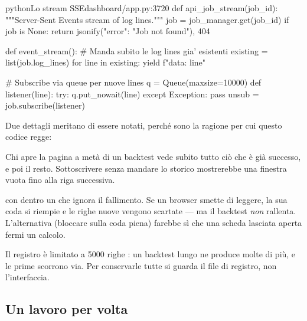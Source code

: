\begin{codiceInterno}{python}{Lo stream SSE}{dashboard/app.py:3720}
    def api_job_stream(job_id):
        """Server-Sent Events stream of log lines."""
        job = job_manager.get(job_id)
        if job is None:
            return jsonify({"error": "Job not found"}), 404

        def event_stream():
            # Manda subito le log lines gia' esistenti
            existing = list(job.log_lines)
            for line in existing:
                yield f"data: {line}\n\n"

            # Subscribe via queue per nuove lines
            q = Queue(maxsize=10000)
            def listener(line):
                try:
                    q.put_nowait(line)
                except Exception:
                    pass
            unsub = job.subscribe(listener)
\end{codiceInterno}

\noindent
Due dettagli meritano di essere notati, perché sono la ragione per cui
questo codice regge:

\begin{description}[leftmargin = 1.6em, style = nextline, itemsep = 4pt]
  \item[Prima lo storico, poi la sottoscrizione]
    Chi apre la pagina a metà di un backtest vede subito tutto ciò che è già
    successo, e poi il resto. Sottoscrivere senza mandare lo storico
    mostrerebbe una finestra vuota fino alla riga successiva.
  \item[La coda è limitata e il \cod{put} non blocca]
     con  dentro un
     che ignora il fallimento. Se un browser smette di
    leggere, la sua coda si riempie e le righe nuove vengono scartate --- ma
    il backtest \emph{non} rallenta. L'alternativa (bloccare sulla coda
    piena) farebbe sì che una scheda lasciata aperta fermi un calcolo.
\end{description}

\begin{nota}{Il registro è limitato a \num{5000} righe}
: un backtest lungo ne produce molte di più, e le
prime scorrono via. Per conservarle tutte si guarda il file di registro, non
l'interfaccia.
\end{nota}

\subsection{Un lavoro per volta}

